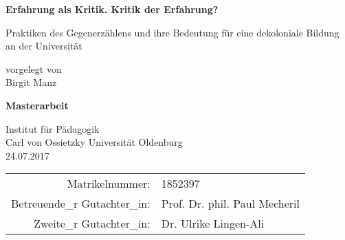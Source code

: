 \documentclass[12pt]{article}
\begin{document}
\onehalfspacing
\setlength{\epigraphwidth}{0.7\textwidth}
\begin{titlepage}
    \begin{center}
        \vspace*{1cm}
        
        \LARGE
        \textbf{Erfahrung als Kritik. Kritik der Erfahrung?}
        
        \vspace{0.5cm}
       \Large 
Praktiken des Gegenerzählens und ihre Bedeutung für eine dekoloniale Bildung an der Universität
        
        \vspace{1.5cm}
        
        vorgelegt von\\
        Birgit Manz
        \vspace{3cm}
       
        \textbf{Masterarbeit}
                
        \vspace{0.8cm}
     
        
        \Large
        Institut für Pädagogik\\
        Carl von Ossietzky Universität Oldenburg\\
        24.07.2017\\
        \vspace{4cm} 
        \begin{table}[htpb]
          \centering
          \Large
          \begin{tabular}{rl}
            Matrikelnummer: & 1852397 \\
            Betreuende\_r Gutachter\_in:& Prof. Dr. phil. Paul Mecheril \\
            Zweite\_r Gutachter\_in: &Dr. Ulrike Lingen-Ali
          \end{tabular}
        \end{table}
          
      \end{center}

\end{titlepage}


\tableofcontents














\end{document}
